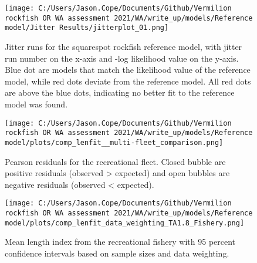 \documentclass[11pt,
  english,
  a4paper,
]{article}
\begin{document}
\tagmcend\tagstructend


\begin{figure}
\centering
\texttt{[image: C:/Users/Jason.Cope/Documents/Github/Vermilion rockfish OR WA assessment 2021/WA/write\_up/models/Reference model/Jitter Results/jitterplot\_01.png]}
\caption{Jitter runs for the squarespot rockfish reference model, with jitter run number on the x-axis and -log likelihood value on the y-axis. Blue dot are models that match the likelihood value of the reference model, while red dots deviate from the reference model. All red dots are above the blue dots, indicating no better fit to the reference model was found.\label{fig:jitter_01}}
\end{figure}

\tagmcend\tagstructend


\begin{figure}
\centering
\texttt{[image: C:/Users/Jason.Cope/Documents/Github/Vermilion rockfish OR WA assessment 2021/WA/write\_up/models/Reference model/plots/comp\_lenfit\_\_multi-fleet\_comparison.png]}
\caption{Pearson residuals for the recreational fleet. Closed bubble are positive residuals (observed \textgreater{} expected) and open bubbles are negative residuals (observed \textless{} expected).\label{fig:rec-pearson}}
\end{figure}

\tagmcend\tagstructend


\begin{figure}
\centering
\texttt{[image: C:/Users/Jason.Cope/Documents/Github/Vermilion rockfish OR WA assessment 2021/WA/write\_up/models/Reference model/plots/comp\_lenfit\_data\_weighting\_TA1.8\_Fishery.png]}
\caption{Mean length index from the recreational fishery with 95 percent confidence intervals based on sample sizes and data weighting.\label{fig:rec-mean-len-fit}}
\end{figure}
\end{document}
